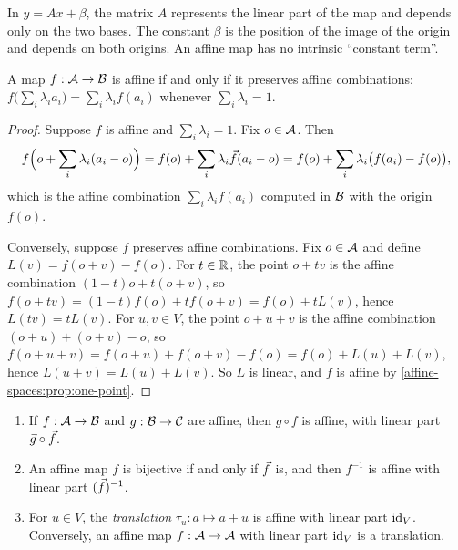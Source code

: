 \begin{notechapter}
\begin{keyidea}
In $y = Ax + \beta$, the matrix $A$ represents the linear part of the map
and depends only on the two bases. The constant $\beta$ is the position of
the image of the origin and depends on both origins. An affine map has no
intrinsic ``constant term''.
\end{keyidea}

\begin{proposition}
\label{affine-spaces:prop:map-comb}
A map $f:\mathcal{A}\to\mathcal{B}$ is affine if and only if it preserves affine
combinations: $f\bigl(\sum_i\lambda_ia_i\bigr) = \sum_i\lambda_if(a_i)$
whenever $\sum_i\lambda_i = 1$.
\end{proposition}

\begin{proof}
Suppose $f$ is affine and $\sum_i\lambda_i = 1$. Fix $o\in\mathcal{A}$. Then
\[
  f\Bigl(o + \sum_i\lambda_i(a_i - o)\Bigr)
  = f(o) + \sum_i\lambda_i\vec{f}(a_i - o)
  = f(o) + \sum_i\lambda_i\bigl(f(a_i) - f(o)\bigr) ,
\]
which is the affine combination $\sum_i\lambda_if(a_i)$ computed in $\mathcal{B}$
with the origin $f(o)$.

Conversely, suppose $f$ preserves affine combinations. Fix $o\in\mathcal{A}$ and
define $L(v) = f(o + v) - f(o)$. For $t\in\mathbb{R}$, the point $o + tv$ is the
affine combination $(1 - t)o + t(o + v)$, so
$f(o + tv) = (1 - t)f(o) + tf(o + v) = f(o) + tL(v)$, hence
$L(tv) = tL(v)$. For $u, v\in V$, the point $o + u + v$ is the affine
combination $(o + u) + (o + v) - o$, so
$f(o + u + v) = f(o + u) + f(o + v) - f(o) = f(o) + L(u) + L(v)$, hence
$L(u + v) = L(u) + L(v)$. So $L$ is linear, and $f$ is affine by
\cref{affine-spaces:prop:one-point}.
\end{proof}

\begin{proposition}
\label{affine-spaces:prop:composition}
\begin{enumerate}[nosep]
  \item If $f:\mathcal{A}\to\mathcal{B}$ and $g:\mathcal{B}\to\mathcal C$ are affine, then
        $g\circ f$ is affine, with linear part $\vec{g}\circ\vec{f}$.
  \item An affine map $f$ is bijective if and only if $\vec{f}$ is, and then
        $f^{-1}$ is affine with linear part $(\vec{f})^{-1}$.
  \item For $u\in V$, the \emph{translation} $\tau_u:a\mapsto a + u$ is
        affine with linear part $\mathrm{id}_V$. Conversely, an affine map
        $f:\mathcal{A}\to\mathcal{A}$ with linear part $\mathrm{id}_V$ is a translation.
\end{enumerate}
\end{proposition}


\end{notechapter}
